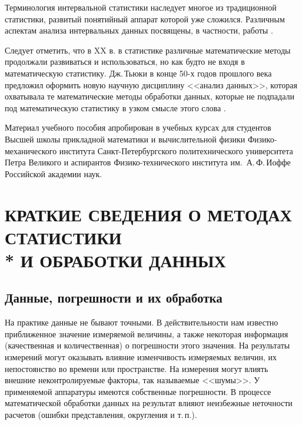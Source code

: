 \documentclass[a5paper,openany]{book}
\begin{document}
{{Терминология интервальной 
статистики наследует 
многое из традиционной статистики,  развитый понятийный аппарат которой уже сложился. 
Различным аспектам анализа интервальных данных посвящены, в частности,  работы \cite{SSharyJCT2017, Kumkov2013, NguyenKreinWuXiang}.

Следует отметить, что в XX в. в статистике различные математические методы  продолжали развиваться и использоваться, но как будто не входя в математическую статистику. Дж.\,Тьюки в конце 50-х годов прошлого века предложил оформить 
новую научную дисциплину <<анализ данных>>, которая 
охватывала те математические методы обработки данных, которые не подпадали 
под математическую статистику в узком смысле этого слова \cite{Tukey1962}.


Материал учебного пособия апробирован в учебных курсах для студентов  
Высшей школы прикладной математики и вычислительной физики
 Физико-механического института Санкт-Петербургского политехнического университета Петра Великого
 и аспирантов Физико-технического института им.~А.\,Ф.\,Иоффе Российской академии наук.
 
	\chapter[КРАТКИЕ СВЕДЕНИЯ О МЕТОДАХ СТАТИСТИКИ И ОБРАБОТКИ ДАННЫХ]%
{КРАТКИЕ СВЕДЕНИЯ О МЕТОДАХ СТАТИСТИКИ\\* И ОБРАБОТКИ ДАННЫХ} 

	\section{Данные, погрешности и их обработка} 


На практике данные не бывают точными. В действительности нам известно приближенное
значение измеряемой величины, а также некоторая информация (качественная 
и количественная) о погрешности этого значения.   
На результаты измерений могут оказывать влияние изменчивость измеряемых величин, 
их непостоянство во времени или пространстве. На измерения могут влиять внешние неконтролируемые факторы, так 
называемые <<шумы>>. 
У применяемой аппаратуры имеются собственные погрешности. 
В процессе математической обработки данных на результат влияют
неизбежные неточности расчетов (ошибки представления,  округления и т.\,п.). 

}}
\end{document}

